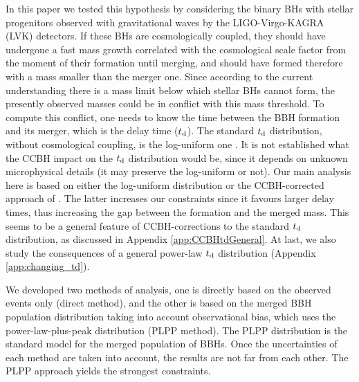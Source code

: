 \documentclass[fleqn,usenatbib,useAMS]{mnras}
\begin{document}
In this paper we tested this hypothesis by considering the binary BHs with stellar progenitors observed with gravitational waves by the LIGO-Virgo-KAGRA (LVK) detectors. If these BHs are cosmologically coupled, they should have undergone a fast mass growth correlated with the cosmological scale factor from the moment of their formation until merging, and should have formed therefore with a mass smaller than the merger one. Since according to the current understanding  there is a mass limit below which stellar BHs cannot form,  the presently observed masses could be in conflict with this mass threshold. To compute this conflict, one needs to know the time between the BBH formation and its merger, which is the delay time ($t_{\rm d}$). The standard $t_{\rm d}$ distribution, without cosmological coupling, is the log-uniform one \citep{KAGRA:2021kbb, KAGRA:2021duu}. It is not established what the CCBH impact on the $t_{\rm d}$ distribution would be, since it depends on unknown microphysical details (it may preserve the log-uniform or not). Our main analysis here is based on either the log-uniform distribution or the CCBH-corrected approach of \cite{Ghodla:2023iaz}. The latter increases our constraints since it favours larger delay times, thus increasing the gap between the formation and the merged mass. This seems to be a  general feature of CCBH-corrections to the standard $t_{\rm d}$ distribution, as discussed in Appendix \ref{app:CCBHtdGeneral}. At last, we also study the consequences of a general power-law $t_{\rm d}$ distribution (Appendix \ref{app:changing_td}). 

We developed two methods of analysis, one is directly based on the observed events only (direct method), and the other is based on the merged BBH population distribution taking into account observational bias, which uses the power-law-plus-peak distribution (PLPP method). The PLPP distribution is the standard model for the merged population of BBHs. Once the uncertainties of each method are taken into account, the results are not far from each other. The PLPP approach yields the strongest constraints.
\end{document}
